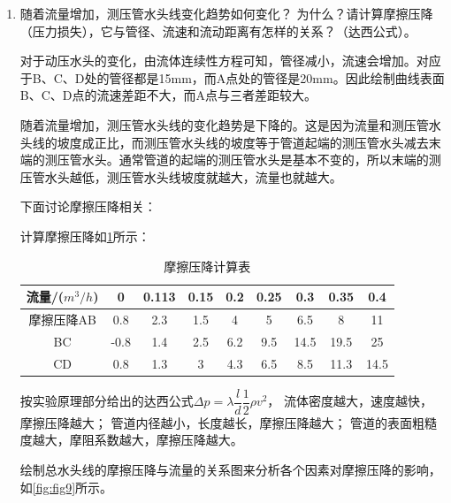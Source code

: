 \documentclass[dvipsnames, svgnames,a4paper,11pt]{article}
\begin{document}
\begin{enumerate}
\begin{enumerate}
			根据总水头曲线，我们可以看出总水头随着流体流动方向逐渐降低，即能量随着流体流动方向逐渐降低。
			
			测压管水头线是沿水流方向各个测点的测压管液面的连线，它反映的是流体的势能。测压管水头线沿程可能下降，也可能上升（当管径沿流向增大时），因为管径增大时流速减小，动能减小而压能增大，如果压能的增大大于水头损失时，水流的势能就增大，测压管水头就上升。总水头线是在测压管水头线的基线上再加上流速水头，它反映的是流体的总能量。
			由于沿流向总是有水头损失，所以总水头线沿程只能下降，不能上升。
			
			\item 随着流量增加，测压管水头线变化趋势如何变化？
			为什么？请计算摩擦压降（压力损失），它与管径、流速和流动距离有怎样的关系？（达西公式）。
			
			对于动压水头的变化，由流体连续性方程可知，管径减小，流速会增加。对应于B、C、D处的管径都是15mm，而A点处的管径是20mm。因此绘制曲线表面B、C、D点的流速差距不大，而A点与三者差距较大。 
			
			随着流量增加，测压管水头线的变化趋势是下降的。这是因为流量和测压管水头线的坡度成正比，而测压管水头线的坡度等于管道起端的测压管水头减去末端的测压管水头。通常管道的起端的测压管水头是基本不变的，所以末端的测压管水头越低，测压管水头线坡度就越大，流量也就越大。
			
			下面讨论摩擦压降相关：
			
			计算摩擦压降如\cref{tab:tab4}所示：
			\begin{table}[h]
				\centering
				\begin{tabular}{|c|c|c|c|c|c|c|c|c|}
					\hline
					流量/($m^3/h$) & 0 & 0.113 & 0.15 & 0.2 & 0.25 & 0.3 & 0.35 & 0.4 \\
					\hline
					摩擦压降AB & 0.8 & 2.3 & 1.5 & 4 & 5 & 6.5 & 8 & 11 \\
					BC & -0.8 & 1.4 & 2.5 & 6.2 & 9.5 & 14.5 & 19.5 & 25 \\
					CD & 0.8 & 1.3 & 3 & 4.3 & 6.5 & 8.5 & 11.3 & 14.5 \\
					\hline
				\end{tabular}
				\caption{摩擦压降计算表}
				\label{tab:tab4}
			\end{table}
			
			按实验原理部分给出的达西公式$\Delta p = \lambda \dfrac{l}{d} \dfrac{1}{2} \rho v^2$，
			流体密度越大，速度越快，摩擦压降越大；
			管道内径越小，长度越长，摩擦压降越大；
			管道的表面粗糙度越大，摩阻系数越大，摩擦压降越大。
			
			绘制总水头线的摩擦压降与流量的关系图来分析各个因素对摩擦压降的影响，如\cref{fig:fig9}所示。
			

\end{enumerate}
\end{enumerate}
\end{document}
